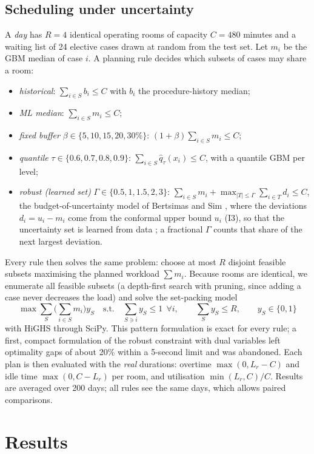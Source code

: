 \documentclass[11pt,a4paper]{article}
\begin{document}
\subsection{Scheduling under uncertainty}
A \emph{day} has $R=4$ identical operating rooms of capacity $C=480$ minutes and a waiting list of 24 elective cases
drawn at random from the test set. Let $m_i$ be the GBM median of case $i$. A planning rule decides which subsets of
cases may share a room:
\begin{itemize}
  \item \emph{historical}: $\sum_{i\in S} b_i \le C$ with $b_i$ the procedure-history median;
  \item \emph{ML median}: $\sum_{i\in S} m_i \le C$;
  \item \emph{fixed buffer} $\beta\in\{5,10,15,20,30\%\}$: $(1+\beta)\sum_{i\in S} m_i \le C$;
  \item \emph{quantile} $\tau\in\{0.6,0.7,0.8,0.9\}$: $\sum_{i\in S}\hat q_\tau(x_i)\le C$, with a quantile GBM per level;
  \item \emph{robust (learned set)} $\Gamma\in\{0.5,1,1.5,2,3\}$: $\sum_{i\in S} m_i + \max_{|T|\le\Gamma}\sum_{i\in T} d_i \le C$,
        the budget-of-uncertainty model of Bertsimas and Sim \cite{bertsimas2004}, where the deviations
        $d_i=u_i-m_i$ come from the conformal upper bound $u_i$ (I3), so that the uncertainty set is learned from data
        \cite{bertsimas2018}; a fractional $\Gamma$ counts that share of the next largest deviation.
\end{itemize}
Every rule then solves the same problem: choose at most $R$ disjoint feasible subsets maximising the planned workload
$\sum m_i$. Because rooms are identical, we enumerate all feasible subsets (a depth-first search with pruning, since
adding a case never decreases the load) and solve the set-packing model
\[
\max \sum_{S} \Big(\sum_{i\in S} m_i\Big) y_S \quad\text{s.t.}\quad \sum_{S\ni i} y_S\le 1\ \ \forall i,\qquad \sum_S y_S\le R,\qquad y_S\in\{0,1\}
\]
with HiGHS through SciPy. This pattern formulation is exact for every rule; a first, compact formulation of the robust
constraint with dual variables left optimality gaps of about 20\% within a 5-second limit and was abandoned. Each plan is
then evaluated with the \emph{real} durations: overtime $\max(0, L_r-C)$ and idle time $\max(0, C-L_r)$ per room, and
utilisation $\min(L_r,C)/C$. Results are averaged over 200 days; all rules see the same days, which allows paired
comparisons.

\section{Results}
\end{document}
